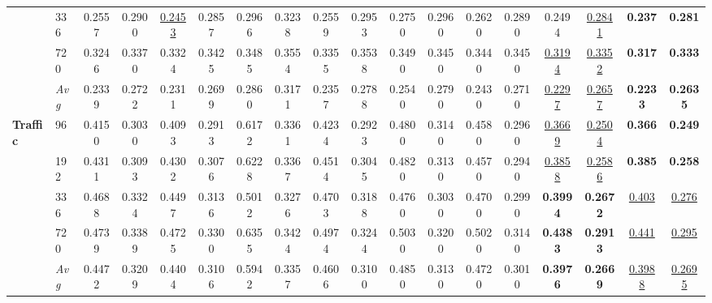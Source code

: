 \begin{tabular}{llcccccccccccccccc}
               & 336        &         0.2557 &         0.2900 & \underline{0.2453} &         0.2857 &         0.2966 &         0.3238 &         0.2559 &         0.2953 &         0.2750 &         0.2960 &         0.2620 &         0.2890 &         0.2494 & \underline{0.2841} & \textbf{0.237} & \textbf{0.281} \\
               & 720        &         0.3246 &         0.3370 &         0.3324 &         0.3425 &         0.3485 &         0.3554 &         0.3355 &         0.3538 &         0.3490 &         0.3450 &         0.3440 &         0.3450 & \underline{0.3194} & \underline{0.3352} & \textbf{0.317} & \textbf{0.333} \\
               & \textit{Avg} &         0.2339 &         0.2722 &         0.2311 &         0.2699 &         0.2860 &         0.3171 &         0.2357 &         0.2788 &         0.2540 &         0.2790 &         0.2430 &         0.2710 & \underline{0.2297} & \underline{0.2657} & \textbf{0.2233} & \textbf{0.2635} \\
\midrule
\textbf{Traffic} & 96         &         0.4150 &         0.3030 &         0.4093 &         0.2913 &         0.6172 &         0.3361 &         0.4234 &         0.2923 &         0.4800 &         0.3140 &         0.4580 &         0.2960 & \underline{0.3669} & \underline{0.2504} & \textbf{0.366} & \textbf{0.249} \\
               & 192        &         0.4311 &         0.3093 &         0.4302 &         0.3076 &         0.6228 &         0.3367 &         0.4514 &         0.3045 &         0.4820 &         0.3130 &         0.4570 &         0.2940 & \underline{0.3858} & \underline{0.2586} & \textbf{0.385} & \textbf{0.258} \\
               & 336        &         0.4688 &         0.3324 &         0.4497 &         0.3136 &         0.5012 &         0.3276 &         0.4703 &         0.3188 &         0.4760 &         0.3030 &         0.4700 &         0.2990 & \textbf{0.3994} & \textbf{0.2672} & \underline{0.403} & \underline{0.276} \\
               & 720        &         0.4739 &         0.3389 &         0.4725 &         0.3300 &         0.6355 &         0.3424 &         0.4974 &         0.3244 &         0.5030 &         0.3200 &         0.5020 &         0.3140 & \textbf{0.4383} & \textbf{0.2913} & \underline{0.441} & \underline{0.295} \\
               & \textit{Avg} &         0.4472 &         0.3209 &         0.4404 &         0.3106 &         0.5942 &         0.3357 &         0.4606 &         0.3100 &         0.4850 &         0.3130 &         0.4720 &         0.3010 & \textbf{0.3976} & \textbf{0.2669} & \underline{0.3988} & \underline{0.2695} \\

\end{tabular}
